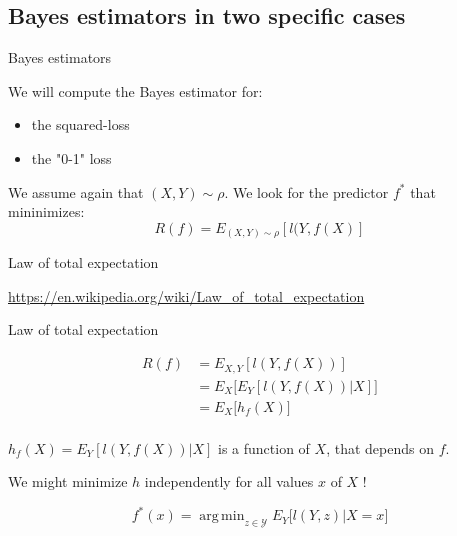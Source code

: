 \documentclass[usenames,dvipsnames]{beamer}
\DeclareMathOperator*{\argmin}{arg\,min}
\newcounter{numexos}%
\newcommand{\exercice}[1]{%
\addtocounter{numexos}{1}%
\textcolor{DarkOrchid}{Exercice\,\thenumexos\,:}\,#1%
}
\begin{document}
%
%
%
%


\subsection{Bayes estimators in two specific cases}
\frame{\tableofcontents[currentsection]}

\begin{frame}{Bayes estimators}

    We will compute the Bayes estimator for:
    \begin{itemize}
    	\item the squared-loss
	\item the "0-1" loss
    \end{itemize}

    We assume again that $(X,Y)\sim \rho$. We look for the predictor $f^*$ that mininimizes:
    \begin{equation}
	R(f)=E_{(X,Y)\sim \rho}[l(Y,f(X)]
    \end{equation}
\end{frame}

\begin{frame}{Law of total expectation}

    \url{https://en.wikipedia.org/wiki/Law_of_total_expectation} 

\end{frame}

\begin{frame}{Law of total expectation}
    
    \begin{equation}
	\begin{aligned}
	    R(f)&=E_{X,Y}[l(Y,f(X))]\\
	    &=E_X\Big[E_Y[l(Y,f(X))|X]\Big]\\
	    &=E_X\Big[h_f(X)\Big]\\
	\end{aligned}
    \end{equation}

    $h_f(X) = E_{Y}[l(Y,f(X))|X]$ is a function of $X$, that depends on $f$.
    \vspace{\baselineskip}

    We might minimize $h$ independently for all values $x$ of $X$ !

	\begin{equation}
	    \label{eq:bayes}
	    f^*(x) = \argmin_{z\in \mathcal{Y} }E_Y\big[ l(Y, z)|X=x\big]
	\end{equation}
\end{frame}
\end{document}
